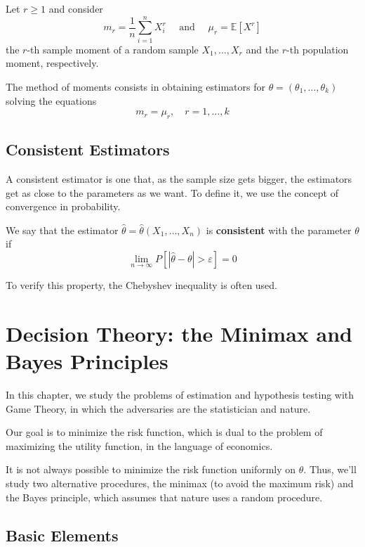 \documentclass[12pt,a4paper]{report}
\begin{document}
Let $r \geq 1$ and consider 
\[
  m_r = \frac{1}{n} \sum_{i=1}^n X_i^r \quad \text{ and } \quad \mu_r = \mathbb{E}[X^r]
\]
the $r$-th sample moment of a random sample $X_1, \ldots, X_r$ and the $r$-th population moment, respectively. 

The method of moments consists in obtaining estimators for $\theta = (\theta_1, \ldots, \theta_k)$ solving the equations 
\[
  m_r = \mu_r, \quad r = 1, \ldots, k
\]

\section{Consistent Estimators}

A consistent estimator is one that, as the sample size gets bigger, the estimators get as close to the parameters as we want. To define it, we use the concept of convergence in probability.

\begin{definition}
    We say that the estimator $\hat{\theta} = \hat{\theta}(X_1, \ldots, X_n)$ is \textbf{consistent} with the parameter $\theta$ if 
    \[
        \lim_{n \to \infty} P[|\hat{\theta} - \theta| > \varepsilon] = 0
    \]
\end{definition}

To verify this property, the Chebyshev inequality is often used. 

\chapter{Decision Theory: the Minimax and Bayes Principles}

In this chapter, we study the problems of estimation and hypothesis testing with Game Theory, in which the adversaries are the statistician and nature. 

Our goal is to minimize the risk function, which is dual to the problem of maximizing the utility function, in the language of economics.

It is not always possible to minimize the risk function uniformly on $\theta$. Thus, we'll study two alternative procedures, the minimax (to avoid the maximum risk) and the Bayes principle, which assumes that nature uses a random procedure. 

\section{Basic Elements}
\end{document}
